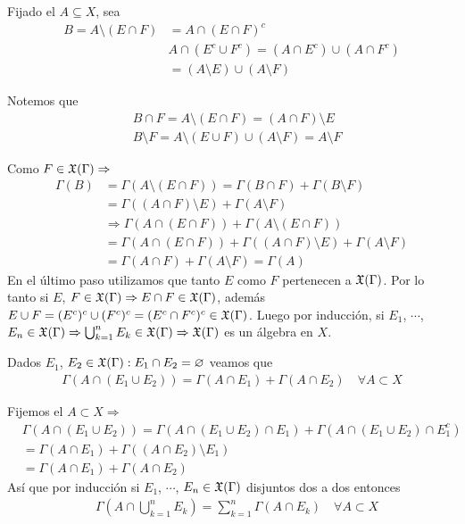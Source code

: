 Fijado el \(A \subseteq X\), sea \begin{align*}
    B = A \setminus (E \cap F) & = A \cap (E \cap F)^c                                  \\
                               & A \cap (E^c \cup F^c) = (A \cap E^c) \cup (A \cap F^c) \\
                               & = (A \setminus E) \cup (A \setminus F)
\end{align*}

Notemos que \begin{align*}
     & B \cap F = A \setminus (E \cap F) = (A \cap F) \setminus E                  \\
     & B \setminus F = A \setminus (E \cup F) \cup (A \setminus F) = A \setminus F
\end{align*}

Como \(F \in \mathfrak{X}(\Gamma) \Rightarrow\) \begin{align*}
    \Gamma(B) & = \Gamma(A \setminus (E \cap F)) = \Gamma(B \cap F) + \Gamma(B \setminus F)          \\
              & = \Gamma((A \cap F) \setminus E) + \Gamma(A \setminus F)                             \\
              & \Rightarrow \Gamma(A \cap (E \cap F)) + \Gamma(A \setminus (E \cap F))               \\
              & = \Gamma(A \cap (E \cap F)) + \Gamma((A \cap F) \setminus E) + \Gamma(A \setminus F) \\
              & = \Gamma(A \cap F) + \Gamma(A \setminus F) = \Gamma(A)
\end{align*}
En el último paso utilizamos que tanto \(E\) como \(F\) pertenecen a \(\mathfrak{X}(\Gamma)\).
Por lo tanto si \(E\), \(F \in \mathfrak{X}(\Gamma) \Rightarrow E \cap F \in \mathfrak{X}(\Gamma)\), además \(E \cup F = (E^c)^c \cup (F^c)^c = (E^c \cap F^c)^c \in \mathfrak{X}(\Gamma)\).
Luego por inducción, si \(E_1\), \(\cdots\), \(E_n \in \mathfrak{X}(\Gamma) \Rightarrow \bigcup_{k = 1}^n E_k \in \mathfrak{X}(\Gamma) \Rightarrow \mathfrak{X}(\Gamma)\) es un álgebra en \(X\).

Dados \(E_1\), \(E_2 \in \mathfrak{X}(\Gamma) : E_1 \cap E_2 = \varnothing\) veamos que \begin{align*}
    \Gamma(A \cap (E_1 \cup E_2)) = \Gamma(A \cap E_1) + \Gamma(A \cap E_2) \quad \forall A \subset X
\end{align*}

Fijemos el \(A \subset X \Rightarrow\) \begin{align*}
     & \Gamma(A \cap (E_1 \cup E_2)) = \Gamma(A \cap (E_1 \cup E_2) \cap E_1) + \Gamma(A \cap (E_1 \cup E_2) \cap E_1^c) \\
     & = \Gamma(A \cap E_1) + \Gamma((A \cap E_2) \setminus E_1)                                                         \\
     & = \Gamma(A \cap E_1) + \Gamma(A \cap E_2)
\end{align*}
Así que por inducción si \(E_1\), \(\cdots\), \(E_n \in \mathfrak{X}(\Gamma)\) disjuntos dos a dos entonces \begin{align*}
     & \Gamma\left( A \cap \bigcup_{k = 1}^n E_k \right) = \sum_{k = 1}^n \Gamma(A \cap E_k) \quad \forall A \subset X
\end{align*}

